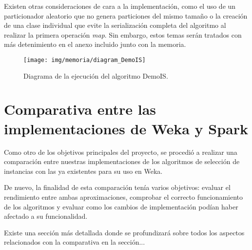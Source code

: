 Existen otras consideraciones de cara a la implementación, como el uso de un particionador aleatorio que no genera particiones del mismo tamaño o la creación de una clase individual que evite la serialización completa del algoritmo al realizar la primera operación \textit{map}. Sin embargo, estos temas serán tratados con más detenimiento en el anexo incluido junto con la memoria.


	\begin{figure}[!h]
		\centering
		\texttt{[image: img/memoria/diagram\_DemoIS]}
		\caption{Diagrama de la ejecución del algoritmo DemoIS.}\label{fig:img/memoria/diagram_DemoIS}
	\end{figure}
	\FloatBarrier


\section{Comparativa entre las implementaciones de Weka y Spark}

Como otro de los objetivos principales del proyecto, se procedió a realizar una comparación entre nuestras implementaciones de los algoritmos de selección de instancias con las ya existentes para su uso en Weka.

De nuevo, la finalidad de esta comparación tenía varios objetivos: evaluar el rendimiento entre ambas aproximaciones, comprobar el correcto funcionamiento de los algoritmos y evaluar como los cambios de implementación podían haber afectado a su funcionalidad.

Existe una sección más detallada donde se profundizará sobre todos los aspectos relacionados con la comparativa en la sección...

